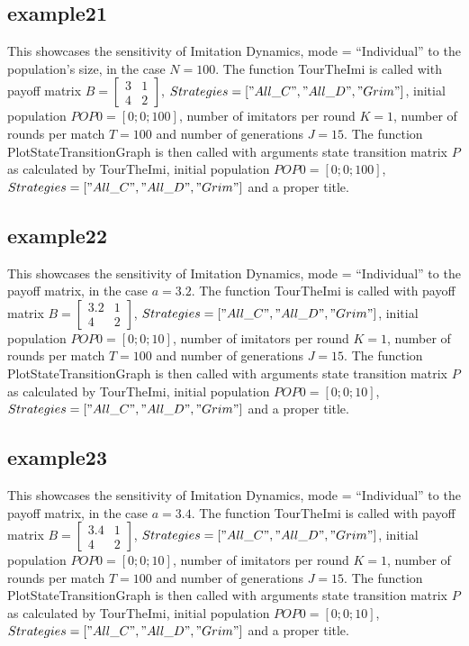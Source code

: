 \subsection{example21}
This showcases the sensitivity of Imitation Dynamics, mode = ``Individual'' to the population's size, in the case $N=100$. The function TourTheImi is called with payoff matrix $B = \begin{bmatrix} 3 & 1 \\ 4 & 2 \end{bmatrix}$, $Strategies = ["All\_C", "All\_D", "Grim"]$, initial population $POP0 = [0; 0; 100]$, number of imitators per round $K=1$, number of rounds per match $T = 100$ and number of generations $J = 15$. The function PlotStateTransitionGraph is then called with arguments state transition matrix $P$ as calculated by TourTheImi, initial population $POP0 = [0; 0; 100]$, $Strategies = ["All\_C", "All\_D", "Grim"]$ and a proper title.

\subsection{example22}
This showcases the sensitivity of Imitation Dynamics, mode = ``Individual'' to the payoff matrix, in the case $a = 3.2$. The function TourTheImi is called with payoff matrix $B = \begin{bmatrix} 3.2 & 1 \\ 4 & 2 \end{bmatrix}$, $Strategies = ["All\_C", "All\_D", "Grim"]$, initial population $POP0 = [0; 0; 10]$, number of imitators per round $K=1$, number of rounds per match $T = 100$ and number of generations $J = 15$. The function PlotStateTransitionGraph is then called with arguments state transition matrix $P$ as calculated by TourTheImi, initial population $POP0 = [0; 0; 10]$, $Strategies = ["All\_C", "All\_D", "Grim"]$ and a proper title.

\subsection{example23}
This showcases the sensitivity of Imitation Dynamics, mode = ``Individual'' to the payoff matrix, in the case $a = 3.4$. The function TourTheImi is called with payoff matrix $B = \begin{bmatrix} 3.4 & 1 \\ 4 & 2 \end{bmatrix}$, $Strategies = ["All\_C", "All\_D", "Grim"]$, initial population $POP0 = [0; 0; 10]$, number of imitators per round $K=1$, number of rounds per match $T = 100$ and number of generations $J = 15$. The function PlotStateTransitionGraph is then called with arguments state transition matrix $P$ as calculated by TourTheImi, initial population $POP0 = [0; 0; 10]$, $Strategies = ["All\_C", "All\_D", "Grim"]$ and a proper title.

